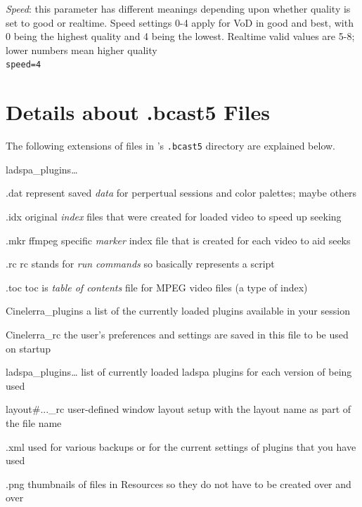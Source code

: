 \textit{Speed}: this parameter has different meanings depending upon whether quality is set to good or realtime. Speed settings 0-4 apply for VoD in good and best, with 0 being the highest quality and 4 being the lowest. Realtime valid values are 5-8; lower numbers mean higher quality\\
\texttt{speed=4}

\section{Details about .bcast5 Files}
\label{sec:details_.bcast5_files}

The following extensions of files in \CGG{}'s \texttt{.bcast5} directory are explained below.

\begin{labeling}{ladspa\_plugins{\dots}}
	\item [.dat] represent saved \textit{data} for perpertual sessions and color palettes; maybe others
	\item [.idx] original \textit{index} files that were created for loaded video to speed up seeking
	\item [.mkr] ffmpeg specific \textit{marker} index file that is created for each video to aid seeks
	\item [.rc] rc stands for \textit{run commands} so basically represents a script
	\item [.toc] toc is \textit{table of contents} file for MPEG video files (a type of index)
	\item [Cinelerra\_plugins] a list of the currently loaded plugins available in your \CGG{} session
	\item [Cinelerra{}\_rc] the user's preferences and settings are saved in this file to be used on startup
	\item [ladspa\_plugins{\dots}] list of currently loaded ladspa plugins for each version of \CGG{} being used
	\item [layout\#...\_rc] user-defined window layout setup with the layout name as part of the file name
	\item [.xml] used for various backups or for the current settings of plugins that you have used
	\item [.png] thumbnails of files in Resources so they do not have to be created over and over
\end{labeling}

